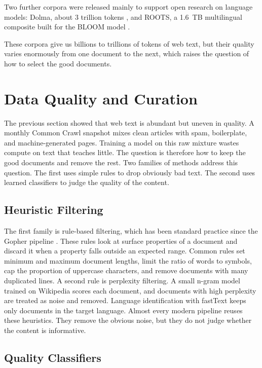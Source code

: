 Two further corpora were released mainly to support open research on language models: Dolma,
about 3 trillion tokens \citep{soldaini2024dolma}, and ROOTS, a 1.6~TB multilingual
composite built for the BLOOM model \citep{laurencon2023roots}.

These corpora give us billions to trillions of tokens of web text, but their quality varies
enormously from one document to the next, which raises the question of how to select the
good documents.
\section{Data Quality and Curation}
\label{sec:corpus-quality}

The previous section showed that web text is abundant but uneven in quality. A monthly
Common Crawl snapshot mixes clean articles with spam, boilerplate, and machine-generated
pages. Training a model on this raw mixture wastes compute on text that teaches little. The
question is therefore how to keep the good documents and remove the rest. Two families of
methods address this question. The first uses simple rules to drop obviously bad text. The
second uses learned classifiers to judge the quality of the content.

\subsection{Heuristic Filtering}

The first family is rule-based filtering, which has been standard practice since the Gopher
pipeline \citep{rae2022gopher}. These rules look at surface properties of a document and
discard it when a property falls outside an expected range. Common rules set minimum and
maximum document lengths, limit the ratio of words to symbols, cap the proportion of
uppercase characters, and remove documents with many duplicated lines. A second rule is
perplexity filtering. A small n-gram model trained on Wikipedia scores each document, and
documents with high perplexity are treated as noise and removed. Language identification
with fastText keeps only documents in the target language. Almost every modern pipeline
reuses these heuristics. They remove the obvious noise, but they do not judge whether the
content is informative.

\subsection{Quality Classifiers}


